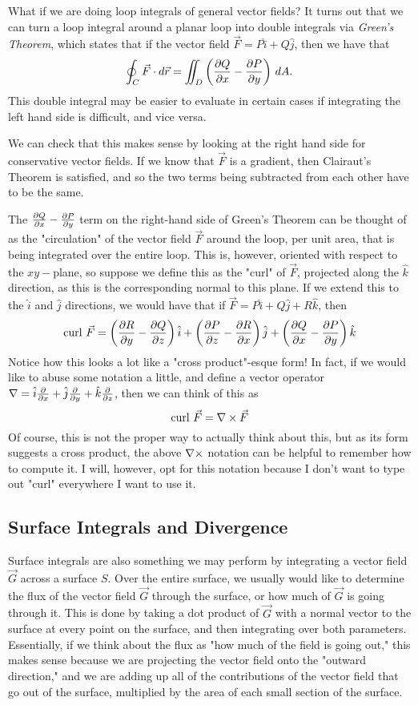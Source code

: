 What if we are doing loop integrals of general vector fields? It turns out that we can turn a loop integral around a planar loop into double integrals via \textit{Green's Theorem}, which states that if the vector field $\vec F = P\hat i + Q \hat j$, then we have that 
\[
	\oint_C \vec F \cdot d\vec r = \iint_D \left( \frac{\partial Q}{\partial x} - \frac{\partial P}{\partial y} \right) \, dA. 
\]
This double integral may be easier to evaluate in certain cases if integrating the left hand side is difficult, and vice versa. 

We can check that this makes sense by looking at the right hand side for conservative vector fields. If we know that $\vec F$ is a gradient, then Clairaut's Theorem is satisfied, and so the two terms being subtracted from each other have to be the same. 

The $\frac{\partial Q}{\partial x} - \frac{\partial P}{\partial y}$ term on the right-hand side of Green's Theorem can be thought of as the "circulation" of the vector field $\vec F$ around the loop, per unit area, that is being integrated over the entire loop. This is, however, oriented with respect to the $xy-$plane, so suppose we define this as the "curl" of $\vec F$, projected along the $\hat k$ direction, as this is the corresponding normal to this plane. If we extend this to the $\hat i$ and $\hat j$ directions, we would have that if $\vec F = P\hat i + Q\hat j + R \hat k$, then 
\[
	\text{curl } \vec F = \left(\frac{\partial R}{\partial y} - \frac{\partial Q}{\partial z}\right) \hat i + \left(\frac{\partial P}{\partial z} - \frac{\partial R}{\partial x}\right) \hat j + \left(\frac{\partial Q}{\partial x} - \frac{\partial P}{\partial y}\right) \hat k 
\]
Notice how this looks a lot like a "cross product"-esque form! In fact, if we would like to abuse some notation a little, and define a vector operator $\nabla = \hat i \frac{\partial }{\partial x} + \hat j \frac{\partial }{\partial y} + \hat k \frac{\partial }{\partial z}$, then we can think of this as
\[
	\text{curl } \vec F = \nabla \times \vec F
\]
Of course, this is not the proper way to actually think about this, but as its form suggests a cross product, the above $\curl$ notation can be helpful to remember how to compute it. I will, however, opt for this notation because I don't want to type out "curl" everywhere I want to use it. 

\subsection{Surface Integrals and Divergence}
Surface integrals are also something we may perform by integrating a vector field $\vec G$ across a surface $S$. Over the entire surface, we usually would like to determine the flux of the vector field $\vec G$ through the surface, or how much of $\vec G$ is going through it. This is done by taking a dot product of $\vec G$ with a normal vector to the surface at every point on the surface, and then integrating over both parameters. Essentially, if we think about the flux as "how much of the field is going out," this makes sense because we are projecting the vector field onto the "outward direction," and we are adding up all of the contributions of the vector field that go out of the surface, multiplied by the area of each small section of the surface.  

